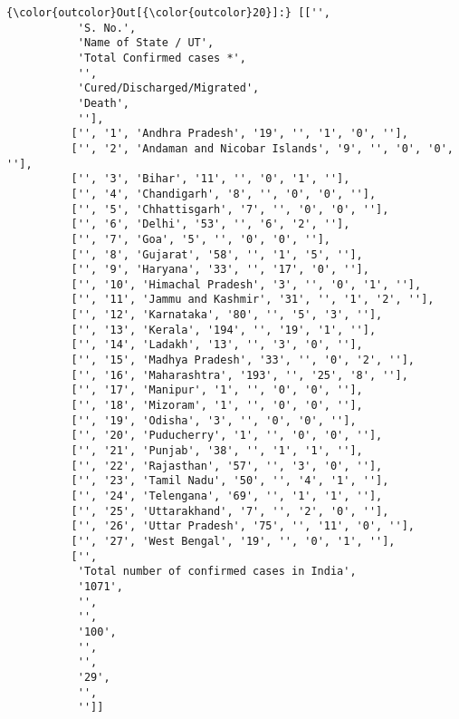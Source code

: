 \documentclass[11pt]{article}
\begin{document}
\begin{Verbatim}[commandchars=\\\{\}]
{\color{outcolor}Out[{\color{outcolor}20}]:} [['',
           'S. No.',
           'Name of State / UT',
           'Total Confirmed cases *',
           '',
           'Cured/Discharged/Migrated',
           'Death',
           ''],
          ['', '1', 'Andhra Pradesh', '19', '', '1', '0', ''],
          ['', '2', 'Andaman and Nicobar Islands', '9', '', '0', '0', ''],
          ['', '3', 'Bihar', '11', '', '0', '1', ''],
          ['', '4', 'Chandigarh', '8', '', '0', '0', ''],
          ['', '5', 'Chhattisgarh', '7', '', '0', '0', ''],
          ['', '6', 'Delhi', '53', '', '6', '2', ''],
          ['', '7', 'Goa', '5', '', '0', '0', ''],
          ['', '8', 'Gujarat', '58', '', '1', '5', ''],
          ['', '9', 'Haryana', '33', '', '17', '0', ''],
          ['', '10', 'Himachal Pradesh', '3', '', '0', '1', ''],
          ['', '11', 'Jammu and Kashmir', '31', '', '1', '2', ''],
          ['', '12', 'Karnataka', '80', '', '5', '3', ''],
          ['', '13', 'Kerala', '194', '', '19', '1', ''],
          ['', '14', 'Ladakh', '13', '', '3', '0', ''],
          ['', '15', 'Madhya Pradesh', '33', '', '0', '2', ''],
          ['', '16', 'Maharashtra', '193', '', '25', '8', ''],
          ['', '17', 'Manipur', '1', '', '0', '0', ''],
          ['', '18', 'Mizoram', '1', '', '0', '0', ''],
          ['', '19', 'Odisha', '3', '', '0', '0', ''],
          ['', '20', 'Puducherry', '1', '', '0', '0', ''],
          ['', '21', 'Punjab', '38', '', '1', '1', ''],
          ['', '22', 'Rajasthan', '57', '', '3', '0', ''],
          ['', '23', 'Tamil Nadu', '50', '', '4', '1', ''],
          ['', '24', 'Telengana', '69', '', '1', '1', ''],
          ['', '25', 'Uttarakhand', '7', '', '2', '0', ''],
          ['', '26', 'Uttar Pradesh', '75', '', '11', '0', ''],
          ['', '27', 'West Bengal', '19', '', '0', '1', ''],
          ['',
           'Total number of confirmed cases in India',
           '1071',
           '',
           '',
           '100',
           '',
           '',
           '29',
           '',
           '']]
\end{Verbatim}
            
\end{document}
